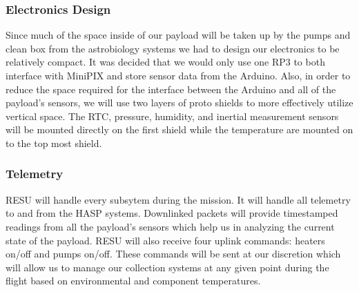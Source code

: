 \subsubsection{Electronics Design}
Since much of the space inside of our payload will be taken up by the pumps and clean box from the astrobiology systems we had to design our electronics to be relatively compact.  It was decided that we would only use one RP3 to both interface with MiniPIX and store sensor data from the Arduino.  Also, in order to reduce the space required for the interface between the Arduino and all of the payload's sensors, we will use two layers of proto shields to more effectively utilize vertical space.
The RTC, pressure, humidity, and inertial measurement sensors will be mounted directly on the first shield while the temperature are mounted on to the top most shield. 

\subsubsection{Telemetry}
RESU will handle every subsytem during the mission.  It will handle all telemetry to and from the HASP systems.  Downlinked packets will provide timestamped readings from all the payload's sensors which help us in analyzing the current state of the payload.  RESU will also receive four uplink commands: heaters on/off and pumps on/off.  These commands will be sent at our discretion which will allow us to manage our collection systems at any given point during the flight based on environmental and component temperatures. 
